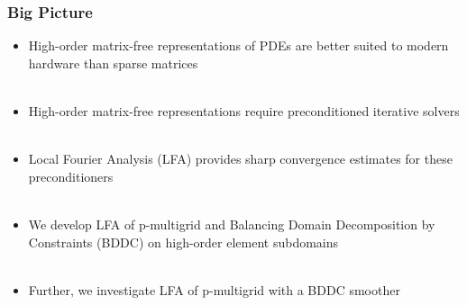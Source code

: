 \documentclass{beamer}
\begin{document}
\begin{frame}
\begin{center}
\frametitle{Big Picture}

\begin{itemize}

\item High-order matrix-free representations of PDEs are better suited to modern hardware than sparse matrices\\

~\\

\item High-order matrix-free representations require preconditioned iterative solvers\\

~\\

\item Local Fourier Analysis (LFA) provides sharp convergence estimates for these preconditioners\\

~\\

\item We develop LFA of p-multigrid and Balancing Domain Decomposition by Constraints (BDDC) on high-order element subdomains\\

~\\

\item Further, we investigate LFA of p-multigrid with a BDDC smoother

\end{itemize}

\end{center}
\end{frame}


\begin{frame}[noframenumbering]
\titlepage %
\end{frame}

\begin{frame}[noframenumbering]
\end{frame}

\begin{frame}[noframenumbering]
\titlepage %
\end{frame}


\end{document}
